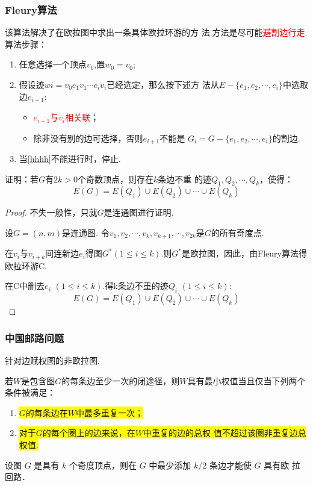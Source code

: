 \subsubsection{Fleury算法}
该算法解决了在欧拉图中求出一条具体欧拉环游的方
法.方法是尽可能\textcolor{red}{避割边行走}.
\noindent 算法步骤：
\begin{enumerate}
	\item 任意选择一个顶点$v_0$,置$w_0=v_0$;
	\item 假设迹$wi=v_0e_1v_1\cdots e_iv_i$已经选定，那么按下述方
	\label{hhhh}
	法从$E-\{e_1,e_2,\cdots,e_i\}$中选取边$e_{i+1}$:
	\begin{itemize}
		\item  \textcolor{red}{$e_{i+1}$与$v_i$相关联}；
		\item 除非没有别的边可选择，否则$e_{i+1}$不能是
		$G_i=G-\{e_1,e_2,\cdots,e_i\}$的割边.
	\end{itemize}
	\item 当\ref{hhhh}不能进行时，停止.
\end{enumerate}

\begin{example}
	证明：若$G$有$2k>0$个奇数顶点，则存在$k$条边不重
	的迹$Q_1, Q_2, \cdots,Q_k$，使得：
	\[
	E(G) = E(Q_1)\cup E(Q_2) \cup \cdots \cup E(Q_k)
	\]
\end{example}
\begin{proof}
	不失一般性，只就$G$是连通图进行证明.
	
	设$G=(n,m)$是连通图. 令$v_1, v_2,\cdots, v_k, v_{k+1},\cdots, v_{2k}$是$G$的所有奇度点.
	
	在$v_i$与$v_{i+k}$间连新边$e_i$得图$G^{*}(1\leq i \leq k)$.则$G^{*}$是欧拉图，因此，由Fleury算法得欧拉环游C.
	
	在C中删去$e_i$ $(1\leq i \leq k)$.得k条边不重的迹$Q_i$ $(1\leq i \leq k)$:
		\[
	E(G) = E(Q_1)\cup E(Q_2) \cup \cdots \cup E(Q_k)
	\]
\end{proof}

\subsubsection{中国邮路问题}

针对边赋权图的非欧拉图.

\begin{theorem}
若$W$是包含图$G$的每条边至少一次的闭途径，则$W$具有最小权值当且仅当下列两个条件被满足：
	\begin{enumerate}
		\item \colorbox{yellow}{$G$的每条边在$W$中最多重复一次；}
		\item \colorbox{yellow}{对于$G$的每个圈上的边来说，在$W$中重复的边的总权
			值不超过该圈非重复边总权值.}
	\end{enumerate}
\end{theorem}
\begin{note}
	设图 $G$ 是具有 $k$ 个奇度顶点，则在 $G$ 中最少添加 $k/2$ 条边才能使 $G$ 具有欧
	拉回路．
\end{note}

